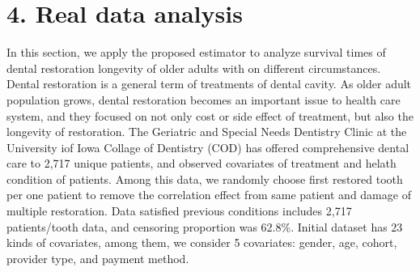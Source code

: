 \documentclass[12pt]{article}
\begin{document}
\section{4. Real data analysis}
	In this section, we apply the proposed estimator to analyze survival times of dental restoration longevity of older adults with on different circumstances.
	Dental restoration is a general term of treatments of dental cavity. As older adult population grows, dental restoration becomes an important issue to health care system, and they focused on not only cost or side effect of treatment, but also the longevity of restoration. The Geriatric and Special Needs Dentistry Clinic at the University iof Iowa Collage of Dentistry (COD) has offered comprehensive dental care to 2,717 unique patients, and observed covariates of treatment and helath condition of patients. Among this data, we randomly choose first restored tooth per one patient to remove the correlation effect from same patient and damage of multiple restoration. Data satisfied previous conditions includes 2,717 patients/tooth data, and censoring proportion was 62.8\%. Initial dataset has 23 kinds of covariates, among them, we consider 5 covariates: gender, age, cohort, provider type, and payment method. 
\end{document}
